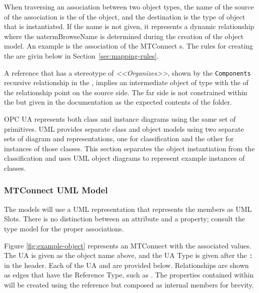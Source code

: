 When traversing an association between two object types, the name of the source of the association is the  of the object, and the destination is the type of object that is instantiated. If the name is not given, it represents a dynamic relationship where the uaterm{BrowseName} is determined during the creation of the object model. An example is the association of the MTConnect s. The rules for creating the  are givin below in Section~\ref{sec:mapping-rules}.

A reference that has a stereotype of \textit{<<Organizes>>}, shown by the \texttt{Components} recursive relationship in the , implies an intermediate object of type  with the  of the relationship point on the source side. The far side is not constrained within the  but given in the documentation as the expected contents of the folder.

OPC UA represents both class and instance diagrams using the same set of primitives. UML provides separate class and object models using two separate sets of diagram and representations, one for classification and the other for instances of those classes. This section separates the object instantiation from the classification and uses UML object diagrams to represent example instances of classes.

\FloatBarrier

\subsubsection{MTConnect UML Model}

The models will use a UML representation that represents the members as UML Slots. There is no distinction between an attribute and a property; consult the type model for the proper associations.



Figure \ref{fig:example-object} represents an MTConnect  with the associated values. The UA  is given as the object name above, and the UA Type is given after the \texttt{:} in the header. Each of the UA  and  are provided below. Relationships are shown as edges that have the Reference Type, such as . The properties contained within will be created using the  reference but composed as internal members for brevity.

